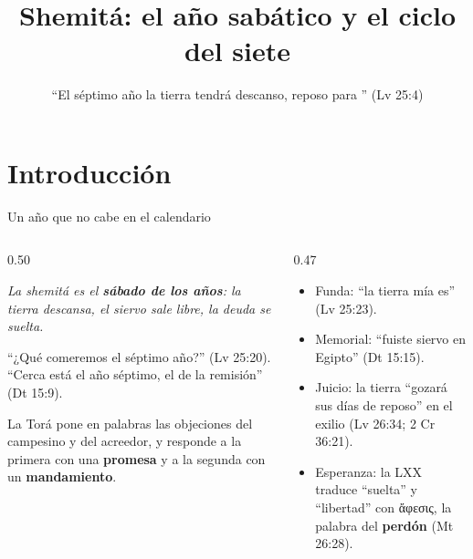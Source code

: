 \documentclass[hyperref={bookmarks=false},aspectratio=169]{beamer}
\title[Shemitá]{\bfseries{Shemitá: el año sabático y el ciclo del siete}}
\subtitle{``El séptimo año la tierra tendrá descanso, reposo para \SENOR'' (Lv 25:4)}
\author{}\institute{}\date{}
\newcommand{\grc}[1]{\foreignlanguage{ancientgreek}{#1}}
\newcommand{\destacar}[1]{\textbf{\textcolor{tierraroja}{#1}}}
\begin{document}
\frame{\titlepage}


\section{Introducción}

\begin{frame}{Un año que no cabe en el calendario}
\begin{columns}[c,onlytextwidth]
\begin{column}{0.50\textwidth}
\begin{tcolorbox}[colback=papiro,colframe=mostaza,boxrule=1.2pt,arc=3pt]
\centering\itshape La shemitá es el \destacar{sábado de los años}: la tierra descansa, el siervo sale libre, la deuda se suelta.
\end{tcolorbox}
\small\RaggedRight ``¿Qué comeremos el séptimo año?'' (Lv 25:20).\\ ``Cerca está el año séptimo, el de la remisión'' (Dt 15:9).\par\medskip
La Torá pone en palabras las objeciones del campesino y del acreedor, y responde a la primera con una \destacar{promesa} y a la segunda con un \destacar{mandamiento}.
\end{column}
\begin{column}{0.47\textwidth}\small
\begin{itemize}
\item Funda: ``la tierra mía es'' (Lv 25:23).
\item Memorial: ``fuiste siervo en Egipto'' (Dt 15:15).
\item Juicio: la tierra ``gozará sus días de reposo'' en el exilio (Lv 26:34; 2 Cr 36:21).
\item Esperanza: la LXX traduce ``suelta'' y ``libertad'' con \grc{ἄφεσις}, la palabra del \destacar{perdón} (Mt 26:28).
\end{itemize}
\end{column}
\end{columns}
\end{frame}
\end{document}
